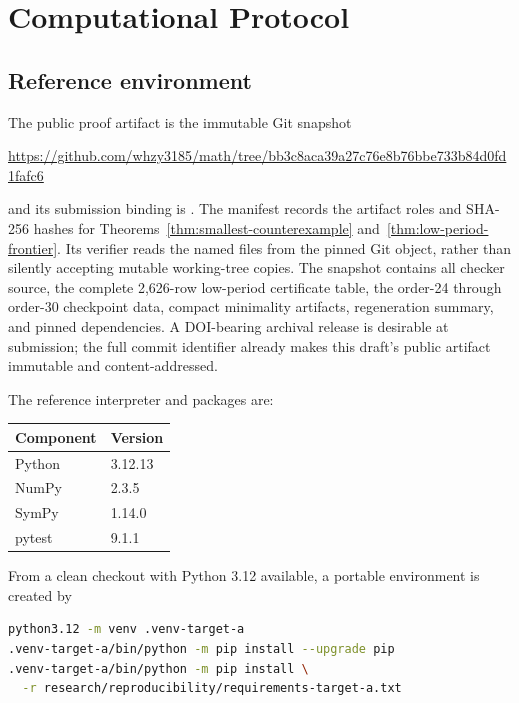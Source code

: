 \section{Computational Protocol}\label{app:computational-protocol}

\subsection{Reference environment}

The public proof artifact is the immutable Git snapshot

\begin{center}
\url{https://github.com/whzy3185/math/tree/bb3c8aca39a27c76e8b76bbe733b84d0fd1fafc6}
\end{center}

and its submission binding is
\allowbreak{}\allowbreak{}. The
manifest records the artifact roles and SHA-256 hashes for Theorems~\ref{thm:smallest-counterexample} and~\ref{thm:low-period-frontier}.
Its verifier reads the named files from the pinned Git object, rather than
silently accepting mutable working-tree copies. The snapshot contains all
checker source, the complete 2,626-row low-period certificate table, the
order-24 through order-30 checkpoint data, compact minimality artifacts,
regeneration summary, and pinned dependencies. A DOI-bearing archival release
is desirable at submission; the full commit identifier already makes this
draft's public artifact immutable and content-addressed.

The reference interpreter and packages are:

\begin{center}
\begin{tabular}{ll}
\toprule
Component & Version \\
\midrule
Python & 3.12.13 \\
NumPy & 2.3.5 \\
SymPy & 1.14.0 \\
pytest & 9.1.1 \\
\bottomrule
\end{tabular}
\end{center}

From a clean checkout with Python 3.12 available, a portable environment is
created by

\begin{lstlisting}[language=bash]
python3.12 -m venv .venv-target-a
.venv-target-a/bin/python -m pip install --upgrade pip
.venv-target-a/bin/python -m pip install \
  -r research/reproducibility/requirements-target-a.txt
\end{lstlisting}

